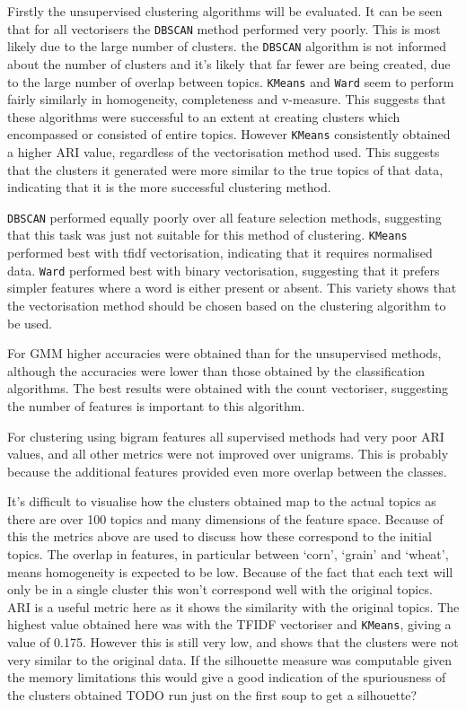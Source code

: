 \documentclass{article}
\begin{document}
Firstly the unsupervised clustering algorithms will be evaluated. It can be seen that for all vectorisers the \verb|DBSCAN| method performed very poorly. This is most likely due to the large number of clusters. the \verb|DBSCAN| algorithm is not informed about the number of clusters and it's likely that far fewer are being created, due to the large number of overlap between topics. \verb|KMeans| and \verb|Ward| seem to perform fairly similarly in homogeneity, completeness and v-measure. This suggests that these algorithms were successful to an extent at creating clusters which encompassed or consisted of entire topics. However \verb|KMeans| consistently obtained a higher ARI value, regardless of the vectorisation method used. This suggests that the clusters it generated were more similar to the true topics of that data, indicating that it is the more successful clustering method.

\verb|DBSCAN| performed equally poorly over all feature selection methods, suggesting that this task was just not suitable for this method of clustering. \verb|KMeans| performed best with tfidf vectorisation, indicating that it requires normalised data. \verb|Ward| performed best with binary vectorisation, suggesting that it prefers simpler features where a word is either present or absent. This variety shows that the vectorisation method should be chosen based on the clustering algorithm to be used.

For GMM higher accuracies were obtained than for the unsupervised methods, although the accuracies were lower than those obtained by the classification algorithms. The best results were obtained with the count vectoriser, suggesting the number of features is important to this algorithm.

For clustering using bigram features all supervised methods had very poor ARI values, and all other metrics were not improved over unigrams. This is probably because the additional features provided even more overlap between the classes. 

It's difficult to visualise how the clusters obtained map to the actual topics as there are over 100 topics and many dimensions of the feature space. Because of this the metrics above are used to discuss how these correspond to the initial topics. The overlap in  features, in particular between `corn', `grain' and `wheat', means homogeneity is expected to be low. Because of the fact that each text will only be in a single cluster this won't correspond well with the original topics. ARI is a useful metric here as it shows the similarity with the original topics. The highest value obtained here was with the TFIDF vectoriser and \verb|KMeans|, giving a value of 0.175. However this is still very low, and shows that the clusters were not very similar to the original data. If the silhouette measure was computable given the memory limitations this would give a good indication of the spuriousness of the clusters obtained TODO run just on the first soup to get a silhouette?
\end{document}
